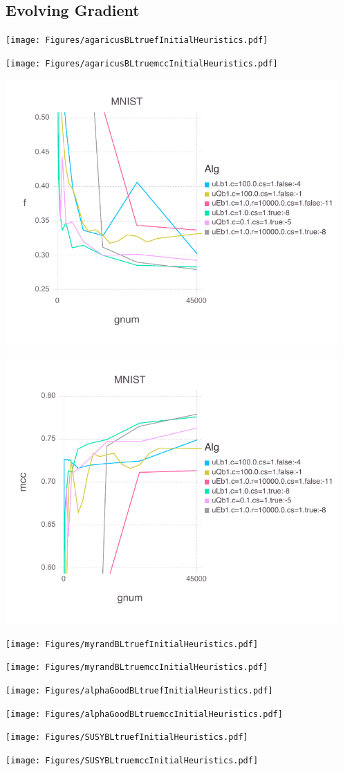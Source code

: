 \documentclass[11pt]{article}
\begin{document}
	
	\subsection{Evolving Gradient}

	\texttt{[image: Figures/agaricusBLtruefInitialHeuristics.pdf]}

	\texttt{[image: Figures/agaricusBLtruemccInitialHeuristics.pdf]}

	\includegraphics[width= 5in]{Figures/MNISTBLtruefInitialHeuristics.pdf}

	\includegraphics[width= 5in]{Figures/MNISTBLtruemccInitialHeuristics.pdf}
	
	\texttt{[image: Figures/myrandBLtruefInitialHeuristics.pdf]}

	\texttt{[image: Figures/myrandBLtruemccInitialHeuristics.pdf]}

	\texttt{[image: Figures/alphaGoodBLtruefInitialHeuristics.pdf]}

	\texttt{[image: Figures/alphaGoodBLtruemccInitialHeuristics.pdf]}

	\texttt{[image: Figures/SUSYBLtruefInitialHeuristics.pdf]}

	\texttt{[image: Figures/SUSYBLtruemccInitialHeuristics.pdf]}
	
	
	
\end{document}

